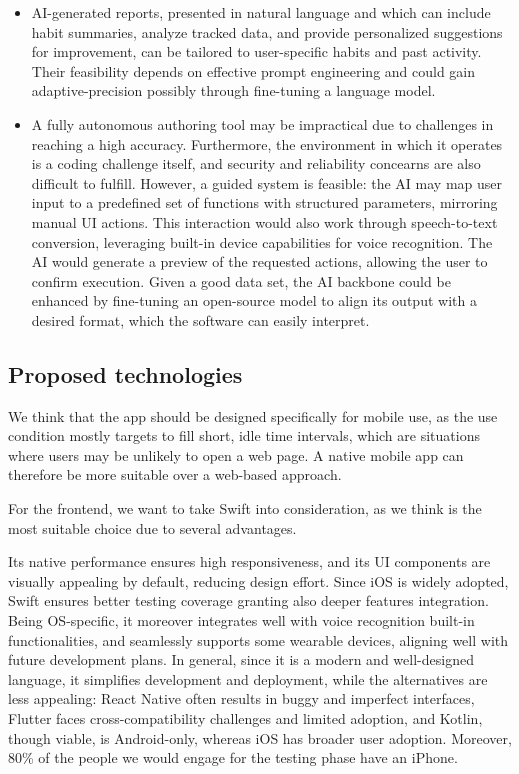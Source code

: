 \documentclass{article}
\begin{document}
\begin{itemize}

	\item AI-generated reports, presented in natural language and which can include habit summaries, analyze tracked data, and provide personalized suggestions for improvement, can be tailored to user-specific habits and past activity. Their feasibility depends on effective prompt engineering and could gain adaptive-precision possibly through fine-tuning a language model.

	\item A fully autonomous authoring tool may be impractical due to challenges in reaching a high accuracy. Furthermore, the environment in which it operates is a coding challenge itself, and security and reliability concearns are also difficult to fulfill.
	      However, a guided system is feasible: the AI may map user input to a predefined set of functions with structured parameters, mirroring manual UI actions. This interaction would also work through speech-to-text conversion, leveraging built-in device capabilities for voice recognition. The AI would generate a preview of the requested actions, allowing the user to confirm execution.
	      Given a good data set, the AI backbone could be enhanced by fine-tuning an open-source model to align its output with a desired format, which the software can easily interpret.

\end{itemize}

\subsection{Proposed technologies}

We think that the app should be designed specifically for mobile use, as the use condition mostly targets to fill short, idle time intervals, which are situations where users may be unlikely to open a web page.
A native mobile app can therefore be more suitable over a web-based approach.

For the frontend, we want to take Swift into consideration, as we think is the most suitable choice due to several advantages.

Its native performance ensures high responsiveness, and its UI components are visually appealing by default, reducing design effort.
Since iOS is widely adopted, Swift ensures better testing coverage granting also deeper features integration.
Being OS-specific, it moreover integrates well with voice recognition built-in functionalities, and seamlessly supports some wearable devices, aligning well with future development plans.
In general, since it is a modern and well-designed language, it simplifies development and deployment, while the alternatives are less appealing: React Native often results in buggy and imperfect interfaces, Flutter faces cross-compatibility challenges and limited adoption, and Kotlin, though viable, is Android-only, whereas iOS has broader user adoption.
Moreover, 80\% of the people we would engage for the testing phase have an iPhone.
\end{document}
